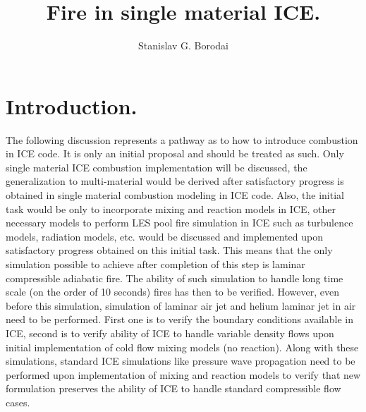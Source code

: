 \documentclass[fleqn,reqno]{amsart}
\title{Fire in single material ICE.}
\author{Stanislav G. Borodai}
\begin{document}
        
\maketitle
\section{Introduction.}
The following discussion represents a pathway as to how to introduce
combustion in ICE code. It is only an initial proposal and should be treated as
such. Only single material ICE combustion implementation will be discussed,
the generalization to multi-material would be derived after satisfactory progress is
obtained in single material combustion modeling in ICE code. Also, the initial task
would be only to incorporate mixing and reaction models in ICE, other necessary
models to perform LES pool fire simulation in ICE such as turbulence models,
radiation models, etc. would be discussed and implemented upon satisfactory progress obtained
on this initial task. This means that the only simulation possible to achieve
after completion of this step is laminar compressible adiabatic fire.
The ability of such simulation to handle long time scale (on the order of 10 seconds)
fires has then to be verified.
However, even
before this simulation, simulation of laminar air jet and helium laminar jet in air need to
be performed. First one is to verify the boundary conditions available in ICE,
second is to verify ability of ICE to handle variable density flows upon
initial implementation of cold flow mixing models (no reaction). Along with
these simulations, standard ICE simulations like pressure wave propagation
need to be performed upon implementation of mixing and reaction models to
verify that new formulation preserves the ability of ICE to handle standard
compressible flow cases.
\end{document}

